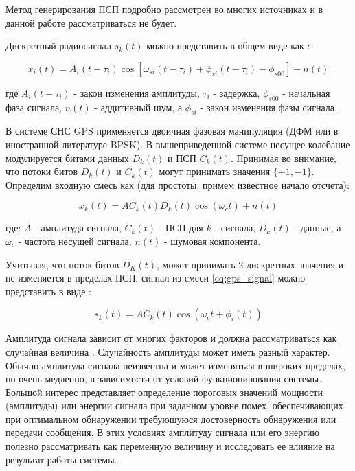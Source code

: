 Метод генерирования ПСП подробно рассмотрен во многих источниках \cite{tsui, akos-book, kaplan}
и в данной работе рассматриваться не будет.

Дискретный радиосигнал $s_k(t)$ можно представить в общем виде как \cite{pestryakov-book}:
\begin{center}
\begin{equation}
	\label{eq:model_signal}
	x_i(t) = A_i(t - \tau_{i})\cos[\omega_{si}(t - \tau_{i}) + \phi_{si}(t - \tau_{i}) - \phi_{s00}] + n(t)
\end{equation}
\end{center}
где $A_i(t - \tau_{i})$ - закон изменения амплитуды, ${\tau_i}$ - задержка, ${\phi_{s00}}$ - начальная фаза сигнала, ${n(t)}$ - аддитивный шум,
а ${\phi_{si}}$ - закон изменения фазы сигнала.

В системе СНС GPS применяется двоичная фазовая манипуляция (ДФМ или в иностранной литературе BPSK).
В вышеприведенной системе несущее колебание модулируется битами данных ${D_k(t)}$ и ПСП
${C_k(t)}$. Принимая во внимание, что потоки битов ${D_k(t)}$ и ${C_k(t)}$ могут принимать значения
${\{+1, -1\}}$. Определим входную смесь как (для простоты, примем известное начало отсчета):

\begin{center}
\begin{equation}
	\label{eq:gps_signal}
	x_k(t) = AC_k(t)D_k(t)\cos(\omega_{c}t ) + n(t)
\end{equation}
\end{center}
где: ${A}$ - амплитуда сигнала, ${C_k(t)}$ - ПСП для ${k}$ - сигнала, ${D_k(t)}$ - данные, а ${\omega_{c}}$ - частота несущей сигнала,
${n(t)}$ - шумовая компонента.

Учитывая, что поток битов ${D_K(t)}$, может принимать 2 дискретных значения и не изменяется в пределах ПСП,
сигнал из смеси \ref{eq:gps_signal} можно представить в виде \cite{sklyar}:
\begin{center}
\begin{equation}
	\label{eq:gps_signal_phase}
	s_k(t) = A C_k(t)\cos(\omega_{c}t + \phi_{i}(t))
\end{equation}
\end{center}
Амплитуда сигнала зависит от многих факторов и должна рассматриваться как случайная величина \cite{pestryakov-book}. Случайность
амплитуды может иметь разный характер. Обычно амплитуда сигнала неизвестна и может изменяться в широких пределах,
но очень медленно, в зависимости от условий функционирования системы. Большой интерес представляет определение пороговых
значений мощности (амплитуды) или энергии сигнала при заданном уровне помех, обеспечивающих при оптимальном
обнаружении требующуюся достоверность обнаружения или передачи сообщения. В этих условиях амплитуду сигнала или его энергию
полезно рассматривать как переменную величину и исследовать ее влияние на результат работы системы.

